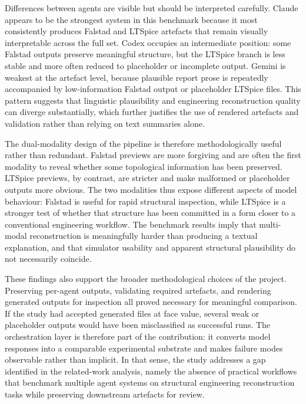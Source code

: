 Differences between agents are visible but should be interpreted carefully. Claude appears to be the strongest system in this benchmark because it most consistently produces Falstad and LTSpice artefacts that remain visually interpretable across the full set. Codex occupies an intermediate position: some Falstad outputs preserve meaningful structure, but the LTSpice branch is less stable and more often reduced to placeholder or incomplete output. Gemini is weakest at the artefact level, because plausible report prose is repeatedly accompanied by low-information Falstad output or placeholder LTSpice files. This pattern suggests that linguistic plausibility and engineering reconstruction quality can diverge substantially, which further justifies the use of rendered artefacts and validation rather than relying on text summaries alone.

The dual-modality design of the pipeline is therefore methodologically useful rather than redundant. Falstad previews are more forgiving and are often the first modality to reveal whether some topological information has been preserved. LTSpice previews, by contrast, are stricter and make malformed or placeholder outputs more obvious. The two modalities thus expose different aspects of model behaviour: Falstad is useful for rapid structural inspection, while LTSpice is a stronger test of whether that structure has been committed in a form closer to a conventional engineering workflow. The benchmark results imply that multi-modal reconstruction is meaningfully harder than producing a textual explanation, and that simulator usability and apparent structural plausibility do not necessarily coincide.

These findings also support the broader methodological choices of the project. Preserving per-agent outputs, validating required artefacts, and rendering generated outputs for inspection all proved necessary for meaningful comparison. If the study had accepted generated files at face value, several weak or placeholder outputs would have been misclassified as successful runs. The orchestration layer is therefore part of the contribution: it converts model responses into a comparable experimental substrate and makes failure modes observable rather than implicit. In that sense, the study addresses a gap identified in the related-work analysis, namely the absence of practical workflows that benchmark multiple agent systems on structural engineering reconstruction tasks while preserving downstream artefacts for review.

